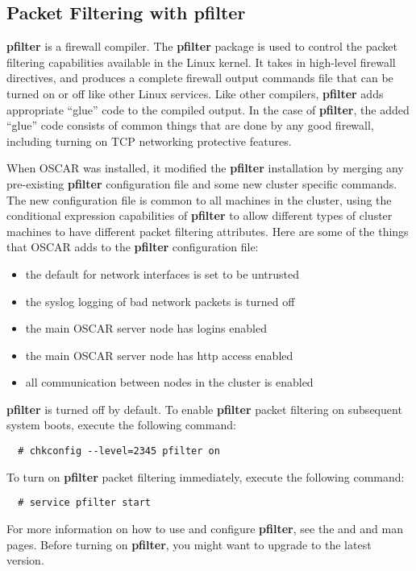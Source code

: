 %
%
%

\subsection{Packet Filtering with pfilter}
\label{app:pfilter-overview}

{\bf pfilter} is a firewall compiler.  The {\bf pfilter} package is
used to control the packet filtering capabilities available in the Linux
kernel.  It takes in high-level firewall directives, and produces a
complete firewall output commands file that can be turned on or off
like other Linux services.  Like other compilers, {\bf pfilter} adds
appropriate ``glue'' code to the compiled output.  In the case of {\bf
  pfilter}, the added ``glue'' code consists of common things that are
done by any good firewall, including turning on TCP networking
protective features.

When OSCAR was installed, it modified the {\bf pfilter} installation
by merging any pre-existing {\bf pfilter} configuration file and some
new cluster specific commands.  The new configuration file is common
to all machines in the cluster, using the conditional expression
capabilities of {\bf pfilter} to allow different types of cluster
machines to have different packet filtering attributes.  
Here are some of the things that OSCAR adds
to the {\bf pfilter} configuration file:

\begin{itemize}
\item the default for network interfaces is set to be untrusted
\item the syslog logging of bad network packets is turned off
\item the main OSCAR server node has  logins enabled
\item the main OSCAR server node has http access enabled
\item all communication between nodes in the cluster is enabled
\end{itemize}

{\bf pfilter} is turned off by default. To enable {\bf pfilter} packet
filtering on subsequent system boots, execute the following command:

\begin{verbatim}
  # chkconfig --level=2345 pfilter on
\end{verbatim}

To turn on {\bf pfilter} packet filtering immediately, execute the
following command:

\begin{verbatim}
  # service pfilter start
\end{verbatim}

For more information on how to use and configure {\bf pfilter}, see
the  and  and
 man pages. Before turning on {\bf pfilter},
you might want to upgrade to the latest version.
